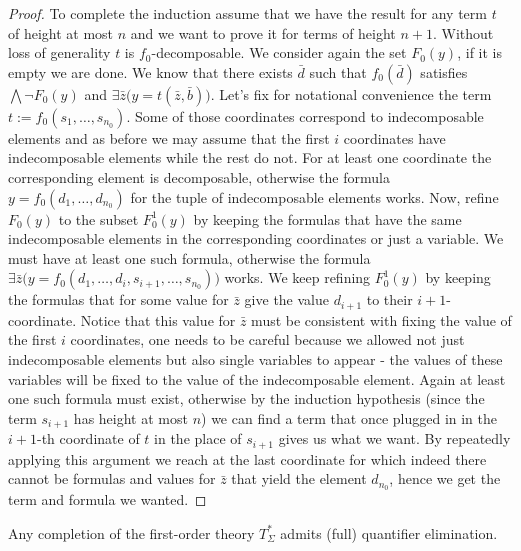 \documentclass[a4paper,11pt]{article}
\begin{document}
\begin{proof}
To complete the induction assume that we have the result for any term $t$ of height at most $n$ and we want to prove it for terms of height $n+1$. Without loss of generality $t$ is $f_0$-decomposable. We consider again the set $F_0(y)$, if it is empty we are done. We know that there exists $\bar d$ such that  $f_0(\bar d)$ satisfies $\bigwedge\lnot F_0(y)$ and $\exists \bar z\big(y=t(\bar z, \bar b)\big)$. Let's fix for notational convenience the term $t:=f_0(s_1, \ldots, s_{n_0})$. Some of those coordinates correspond to indecomposable elements and as before we may assume that the first $i$ coordinates have indecomposable elements while the rest do not. For at least one coordinate the corresponding element is decomposable,  otherwise the formula $y=f_0(d_1, \ldots, d_{n_0})$ for the tuple of indecomposable elements works. Now, refine $F_0(y)$ to the subset $F_0^1(y)$ by keeping the formulas that have the same indecomposable elements in the corresponding coordinates or just a variable. We must have at least one such formula, otherwise the formula $\exists \bar z\big(y=f_0(d_1, \ldots, d_i, s_{i+1}, \ldots, s_{n_0})\big)$  works. We keep refining $F_0^1(y)$ by keeping the formulas that for some value for $\bar z$ give the value $d_{i+1}$ to their $i+1$-coordinate. Notice that this value for $\bar z$ must be consistent with fixing the value of the first $i$ coordinates, one needs to be careful because we allowed not just indecomposable elements but also single variables to appear - the values of these variables will be fixed to the value of the indecomposable element. Again at least one such formula must exist, otherwise by the induction hypothesis (since the term $s_{i+1}$ has height at most $n$) we can find a term that once plugged in in the $i+1$-th coordinate of $t$ in the place of $s_{i+1}$ gives us what we want. By repeatedly applying this argument we reach at the last coordinate for which indeed there cannot be formulas and values for $\bar z$ that yield the element $d_{n_0}$, hence we get the term and formula we wanted.   
  

\end{proof}

\begin{theorem}
Any completion of the first-order theory $T_\Sigma^*$ admits (full) quantifier elimination.  
\end{theorem}
\end{document}
